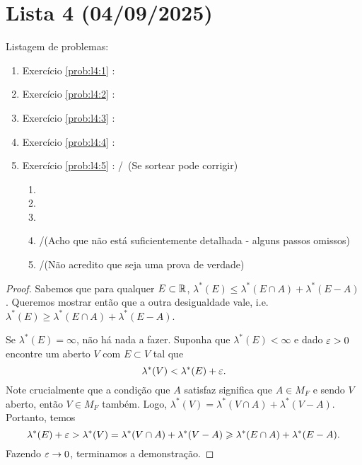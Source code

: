 \clearpage
\section{Lista 4 (04/09/2025)}

Listagem de problemas:
\begin{enumerate}
    \item Exercício \ref{prob:l4:1} : \checkmark
    \item Exercício \ref{prob:l4:2} : \checkmark
    \item Exercício \ref{prob:l4:3} : \checkmark
    \item Exercício \ref{prob:l4:4} : \checkmark
    \item Exercício \ref{prob:l4:5} : \checkmark/\Frowny\,  (Se sortear pode corrigir)
    \begin{enumerate}[label=(\alph*)]
        \item \checkmark
        \item \checkmark
        \item \checkmark
        \item \Frowny /\checkmark (Acho que não está suficientemente detalhada - alguns passos omissos)
        \item \Frowny/\checkmark (Não acredito que seja uma prova de verdade)
    \end{enumerate}
\end{enumerate}

\begin{problem}
    \label{prob:l4:1}
\end{problem}
\begin{proof}
    Sabemos que para qualquer $E \subset \mathbb{R}$, $\lambda^*(E) \leq \lambda^*(E \cap A) + \lambda^*(E - A)$.
    Queremos mostrar então que a outra desigualdade vale, i.e. $\lambda^*(E) \geq \lambda^*(E \cap A) + \lambda^*(E - A)$.
    
    Se $\lambda^*(E) = \infty$, não há nada a fazer. Suponha que $\lambda^*(E) < \infty$ e dado $\varepsilon > 0$
    encontre um aberto $V$ com $E \subset V$ tal que 
    $$\lambda^*(V) < \lambda^*(E) + \varepsilon .$$
    Note crucialmente que a condição que $A$ satisfaz significa que $A \in M_F$
    e sendo $V$ aberto, então $V \in M_F$ também. Logo, $\lambda^*(V) = \lambda^*(V \cap A) + \lambda^*(V - A)$.
    Portanto, temos 
    $$\lambda^*(E) + \varepsilon > \lambda^*(V) = \lambda^*(V \cap A) + \lambda^*(V - A) \geqslant \lambda^*(E \cap A) + \lambda^*(E - A).$$
    Fazendo $\varepsilon \rightarrow 0$, terminamos a demonstração.
\end{proof}

